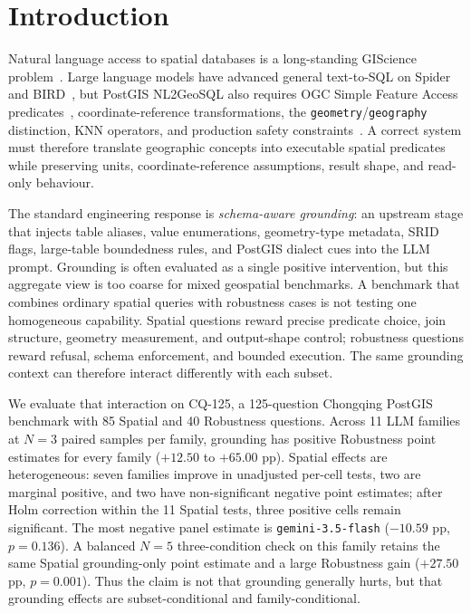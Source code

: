 \documentclass[11pt]{article}
\begin{document}
\section{Introduction}
\label{sec:intro}

Natural language access to spatial databases is a long-standing GIScience problem~\citep{goodchild1992gis,egenhofer1991topological,clementini1993small}. Large language models have advanced general text-to-SQL on Spider~\citep{yu2018spider} and BIRD~\citep{li2023bird}, but PostGIS NL2GeoSQL also requires OGC Simple Feature Access predicates~\citep{ogcsfs}, coordinate-reference transformations, the \texttt{geometry}/\texttt{geography} distinction, KNN operators, and production safety constraints~\citep{postgis}. A correct system must therefore translate geographic concepts into executable spatial predicates while preserving units, coordinate-reference assumptions, result shape, and read-only behaviour.

The standard engineering response is \emph{schema-aware grounding}: an upstream stage that injects table aliases, value enumerations, geometry-type metadata, SRID flags, large-table boundedness rules, and PostGIS dialect cues into the LLM prompt. Grounding is often evaluated as a single positive intervention, but this aggregate view is too coarse for mixed geospatial benchmarks. A benchmark that combines ordinary spatial queries with robustness cases is not testing one homogeneous capability. Spatial questions reward precise predicate choice, join structure, geometry measurement, and output-shape control; robustness questions reward refusal, schema enforcement, and bounded execution. The same grounding context can therefore interact differently with each subset.

We evaluate that interaction on CQ-125, a 125-question Chongqing PostGIS benchmark with 85 Spatial and 40 Robustness questions. Across 11 LLM families at $N{=}3$ paired samples per family, grounding has positive Robustness point estimates for every family ($+12.50$ to $+65.00$ pp). Spatial effects are heterogeneous: seven families improve in unadjusted per-cell tests, two are marginal positive, and two have non-significant negative point estimates; after Holm correction within the 11 Spatial tests, three positive cells remain significant. The most negative panel estimate is \texttt{gemini-3.5-flash} ($-10.59$ pp, $p=0.136$). A balanced $N{=}5$ three-condition check on this family retains the same Spatial grounding-only point estimate and a large Robustness gain ($+27.50$ pp, $p=0.001$). Thus the claim is not that grounding generally hurts, but that grounding effects are subset-conditional and family-conditional.
\end{document}
